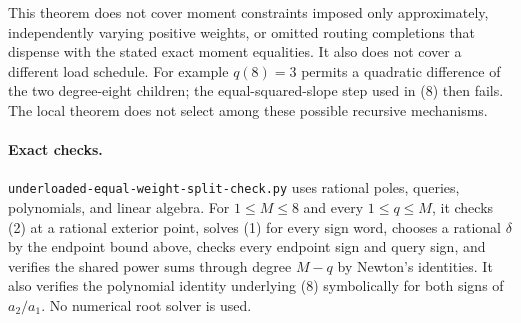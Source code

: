\documentclass[11pt]{article}
\begin{document}
This theorem does not cover moment constraints imposed only
approximately, independently varying positive weights, or omitted
routing completions that dispense with the stated exact moment equalities. It also does not
cover a different load schedule. For example $q(8)=3$ permits a
quadratic difference of the two degree-eight children; the
equal-squared-slope step used in (8) then fails. The local theorem
does not select among these possible recursive mechanisms.

\paragraph{Exact checks.}
\texttt{underloaded-equal-weight-split-check.py} uses rational poles,
queries, polynomials, and linear algebra. For $1\leq M\leq8$ and
every $1\leq q\leq M$, it checks (2) at a rational exterior point,
solves (1) for every sign word, chooses a rational $\delta$ by the
endpoint bound above, checks every endpoint sign and query sign,
and verifies the shared power sums through degree $M-q$ by Newton's
identities. It also verifies the polynomial identity underlying (8)
symbolically for both signs of $a_2/a_1$. No numerical root solver
is used.
\end{document}
